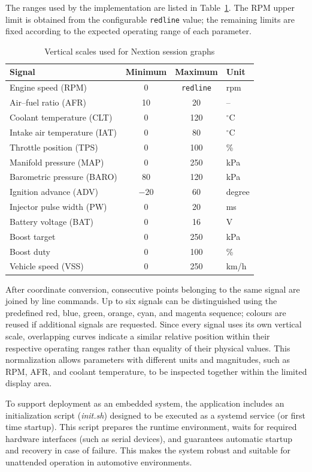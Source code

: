 The ranges used by the implementation are listed in Table~\ref{tab:nextion_graph_ranges}. The RPM upper limit is obtained from the configurable \texttt{redline} value; the remaining limits are fixed according to the expected operating range of each parameter.

\begin{table}[H]
\centering
\begin{tabular}{|l|c|c|l|}
\hline
\textbf{Signal} & \textbf{Minimum} & \textbf{Maximum} & \textbf{Unit} \\
\hline
Engine speed (RPM) & 0 & \texttt{redline} & rpm \\
Air--fuel ratio (AFR) & 10 & 20 & -- \\
Coolant temperature (CLT) & 0 & 120 & $^{\circ}$C \\
Intake air temperature (IAT) & 0 & 80 & $^{\circ}$C \\
Throttle position (TPS) & 0 & 100 & \% \\
Manifold pressure (MAP) & 0 & 250 & kPa \\
Barometric pressure (BARO) & 80 & 120 & kPa \\
Ignition advance (ADV) & $-20$ & 60 & degree \\
Injector pulse width (PW) & 0 & 20 & ms \\
Battery voltage (BAT) & 0 & 16 & V \\
Boost target & 0 & 250 & kPa \\
Boost duty & 0 & 100 & \% \\
Vehicle speed (VSS) & 0 & 250 & km/h \\
\hline
\end{tabular}
\caption{Vertical scales used for Nextion session graphs}
\label{tab:nextion_graph_ranges}
\end{table}

After coordinate conversion, consecutive points belonging to the same signal are joined by line commands. Up to six signals can be distinguished using the predefined red, blue, green, orange, cyan, and magenta sequence; colours are reused if additional signals are requested. Since every signal uses its own vertical scale, overlapping curves indicate a similar relative position within their respective operating ranges rather than equality of their physical values. This normalization allows parameters with different units and magnitudes, such as RPM, AFR, and coolant temperature, to be inspected together within the limited display area.

To support deployment as an embedded system, the application includes an initialization script (\textit{init.sh}) designed to be executed as a systemd service (or first time startup). This script prepares the runtime environment, waits for required hardware interfaces (such as serial devices), and guarantees automatic startup and recovery in case of failure. This makes the system robust and suitable for unattended operation in automotive environments.


